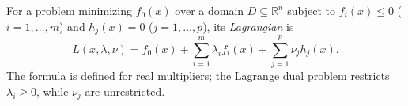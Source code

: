 
For a problem minimizing $f_0(x)$ over a domain $D\subseteq\mathbb R^n$ subject to $f_i(x)\le0$ ($i=1,\ldots,m$) and $h_j(x)=0$ ($j=1,\ldots,p$), its \emph{Lagrangian} is
\[
L(x,\lambda,\nu)=f_0(x)+\sum_{i=1}^m\lambda_i f_i(x)+\sum_{j=1}^p\nu_j h_j(x).
\]
The formula is defined for real multipliers; the Lagrange dual problem restricts $\lambda_i\ge0$, while $\nu_j$ are unrestricted.
